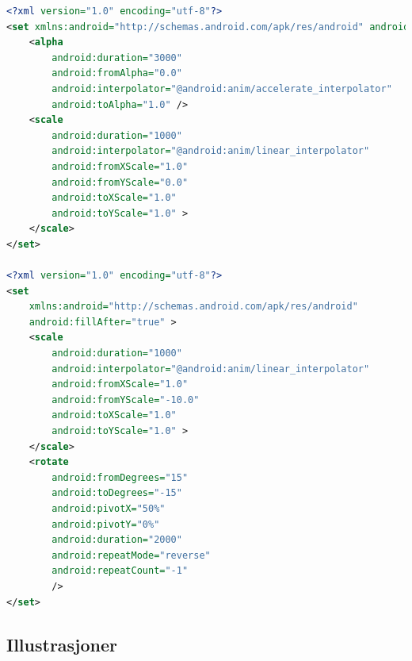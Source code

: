 \begin{lstlisting}[language=XML, caption=Konfigurasjon for samtlige animasjoner i startskjerm, label=xml:animasjoner]
<?xml version="1.0" encoding="utf-8"?>
<set xmlns:android="http://schemas.android.com/apk/res/android" android:fillAfter="true">
    <alpha
        android:duration="3000"
        android:fromAlpha="0.0"
        android:interpolator="@android:anim/accelerate_interpolator"
        android:toAlpha="1.0" />
    <scale
        android:duration="1000"
        android:interpolator="@android:anim/linear_interpolator"
        android:fromXScale="1.0"
        android:fromYScale="0.0"
        android:toXScale="1.0"
        android:toYScale="1.0" >
    </scale>
</set>

<?xml version="1.0" encoding="utf-8"?>
<set
    xmlns:android="http://schemas.android.com/apk/res/android"
    android:fillAfter="true" >
    <scale
        android:duration="1000"
        android:interpolator="@android:anim/linear_interpolator"
        android:fromXScale="1.0"
        android:fromYScale="-10.0"
        android:toXScale="1.0"
        android:toYScale="1.0" >
    </scale>
    <rotate
        android:fromDegrees="15"
        android:toDegrees="-15"
        android:pivotX="50%"
        android:pivotY="0%"
        android:duration="2000"
        android:repeatMode="reverse"
        android:repeatCount="-1"
        />
</set>
\end{lstlisting}



\subsection{Illustrasjoner}


